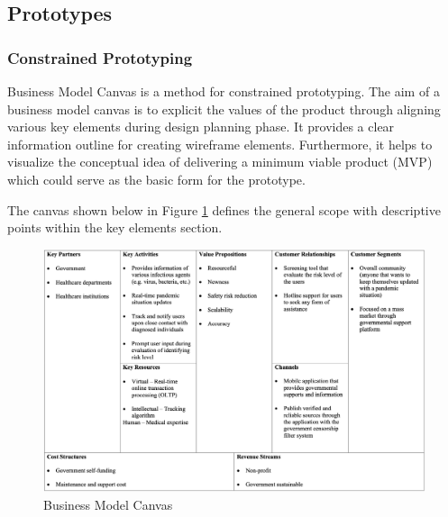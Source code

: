   \subsection{Prototypes}
    \subsubsection{Constrained Prototyping}
      \par Business Model Canvas is a method for constrained prototyping. The aim of a business model canvas is to explicit the values of the product through aligning various key elements during design planning phase. It provides a clear information outline for creating wireframe elements. Furthermore, it helps to visualize the conceptual idea of delivering a minimum viable product (MVP) which could serve as the basic form for the prototype.

      \par The canvas shown below in Figure \ref{fig:bmc} defines the general scope with descriptive points within the key elements section.

      \begin{figure}[H]
        \centering
        \includegraphics[width=\linewidth]{img/bmc.png}
        \caption{Business Model Canvas}
        \label{fig:bmc}
      \end{figure}
    
